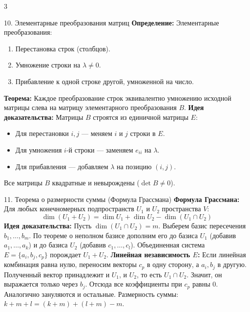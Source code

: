 \documentclass[8pt, a4paper, landscape]{extarticle}
\begin{document}
\begin{multicols*}{3}
\begin{ticket}{10. Элементарные преобразования матриц}
\textbf{Определение:} Элементарные преобразования:
\begin{enumerate}
    \item Перестановка строк (столбцов).
    \item Умножение строки на $\lambda \neq 0$.
    \item Прибавление к одной строке другой, умноженной на число.
\end{enumerate}
\textbf{Теорема:} Каждое преобразование строк эквивалентно умножению исходной матрицы слева на матрицу элементарного преобразования $B$.
\tcblower
\textbf{Идея доказательства:} Матрицы $B$ строятся из единичной матрицы $E$:
\begin{itemize}
    \item Для перестановки $i, j$ --- меняем $i$ и $j$ строки в $E$.
    \item Для умножения $i$-й строки --- заменяем $e_{ii}$ на $\lambda$.
    \item Для прибавления --- добавляем $\lambda$ на позицию $(i, j)$.
\end{itemize}
Все матрицы $B$ квадратные и невырождены ($\det B \neq 0$).
\end{ticket}

\begin{ticket}{11. Теорема о размерности суммы (Формула Грассмана)}
\textbf{Формула Грассмана:} Для любых конечномерных подпространств $U_1$ и $U_2$ пространства $V$:
\[\dim(U_1 + U_2) = \dim U_1 + \dim U_2 - \dim(U_1 \cap U_2)\]
\tcblower
\textbf{Идея доказательства:} 
Пусть $\dim(U_1 \cap U_2) = m$. Выберем базис пересечения $b_1, \dots, b_m$. 
По теореме о неполном базисе дополним его до базиса $U_1$ (добавив $a_1, \dots, a_k$) и до базиса $U_2$ (добавив $c_1, \dots, c_l$).
Объединенная система $E = \{a_i, b_j, c_p\}$ порождает $U_1 + U_2$. 
\textbf{Линейная независимость $E$:} Если линейная комбинация равна нулю, переносим векторы $c_p$ в одну сторону, а $a_i, b_j$ в другую. Полученный вектор принадлежит и $U_1$, и $U_2$, то есть $U_1 \cap U_2$. Значит, он выражается только через $b_j$. Отсюда все коэффициенты при $c_p$ равны 0. Аналогично зануляются и остальные. 
Размерность суммы: $k+m+l = (k+m) + (l+m) - m$.
\end{ticket}


\end{multicols*}
\end{document}
